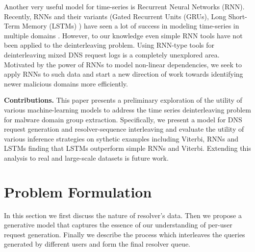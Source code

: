 \documentclass[conference]{IEEEtran}
\begin{document}
	Another very useful model for time-series is Recurrent Neural Networks
	(RNN).  Recently, RNNs and their variants (Gated Recurrent Units
	(GRUs)\cite{chung2014empirical}, Long Short-Term Memory
	(LSTMs) \cite{Hochreiter}) have seen a lot of success in modeling
	time-series in multiple domains \cite{bahdanau2014neural,
		NIPS2008_3449, sutskever2014sequence}.  However, to our knowledge even
	simple RNN tools have not been applied to the deinterleaving
	problem. Using RNN-type tools for deinterleaving mixed DNS request
	logs is a completely unexplored area.  Motivated by the power of RNNs
	to model non-linear dependencies, we seek to apply RNNs to such data
	and start a new direction of work towards identifying newer malicious
	domains more efficiently.
	
	{\bf Contributions. } This paper presents a preliminary exploration of
	the utility of various machine-learning models to address the time
	series deinterleaving problem for malware domain group extraction.
	Specifically, we present a model for DNS request generation and
	resolver-sequence interleaving and evaluate the utility of various
	inference strategies on sythetic examples including Viterbi, RNNs and
	LSTMs finding that LSTMs outperform simple RNNs and Viterbi.  Extending
	this analysis to real and large-scale datasets is future work. 
	
	\section{Problem Formulation}
	\label{sec:gen}
	In this section we first discuss the nature of resolver's data.
	Then we propose a generative model that captures the essence of our understanding of per-user request generation.
	Finally we describe the process which interleaves the queries generated by different users and form the final resolver queue. 
	
\end{document}
